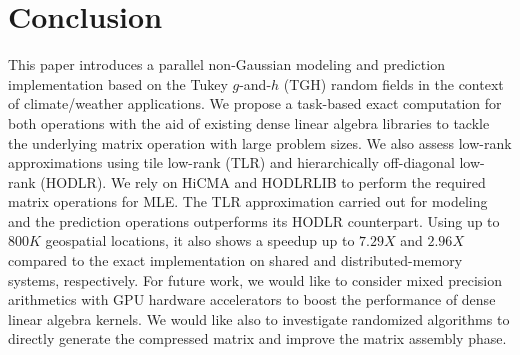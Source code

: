 \documentclass[conference]{IEEEtran}
\begin{document}
\section{Conclusion}
This paper introduces a parallel non-Gaussian modeling and
prediction implementation based on the Tukey $g$-and-$h$ (TGH)
random fields in the context of climate/weather applications. 
We propose a task-based exact computation for both operations
with the aid of existing dense linear algebra libraries to tackle the underlying matrix operation with large problem sizes. We also
assess low-rank approximations using tile low-rank (TLR) and hierarchically
off-diagonal low-rank (HODLR). We rely on HiCMA and HODLRLIB to perform the required
matrix operations for MLE. The TLR approximation carried out
 for  modeling and the prediction
operations outperforms its HODLR counterpart. Using up to $800K$ geospatial locations, it also shows a speedup up to 
$7.29X$ and $2.96X$ compared to the exact implementation on shared and distributed-memory systems,
respectively. For future work, we would like to consider mixed precision arithmetics with GPU
hardware accelerators to boost the performance of dense linear algebra kernels. We would like 
also to investigate randomized algorithms to directly generate the compressed matrix and improve
the matrix assembly phase.






\end{document}
